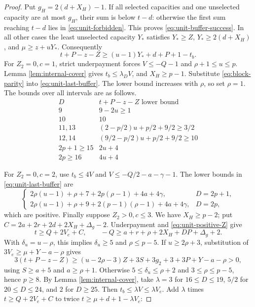 \documentclass[11pt,a4paper]{article}
\theoremstyle{definition}
\begin{document}
\begin{proof}
Put $g_H=2(d+X_H)-1$.
If all selected capacities and one unselected capacity are at most $g_H$, their sum is below $t-d$: otherwise the first sum reaching $t-d$ lies in \eqref{eq:unit-forbidden}.
This proves \eqref{eq:unit-buffer-success}.
In all other cases the least unselected capacity $Y_*$ satisfies
$Y_*\ge Z$, $Y_*\ge2(d+X_H)$, and $\mu\ge z+uY_*$.
Consequently
\begin{equation}\label{eq:unit-last-buffer}
 t+P-z-Z\ge(u-1)Y_*+d+P+1-t_b.
\end{equation}
For $Z_2=0,c=1$, strict underpayment forces $V\le-Q-1$ and $\rho+1\le u\le p$.
Lemma \ref{lem:internal-cover} gives $t_b\le\lambda_DV$, and $X_H\ge p-1$.
Substitute \eqref{eq:block-parity} into \eqref{eq:unit-last-buffer}. The lower bound increases with $\rho$, so set $\rho=1$.
The bounds over all intervals are as follows.
\[
\begin{array}{c|c}
D& t+P-z-Z\text{ lower bound}\\\hline
9&9-2u\ge1\\
10&10\\
11,13&(2-p/2)u+p/2+9/2\ge3/2\\
12,14&(9/2-p/2)u+p/2+9/2\ge10\\
2p+1\ge15&2u+4\\
2p\ge16&4u+4
\end{array}
\]

For $Z_2=0,c=2$, use $t_b\le4V$ and
$V\le-Q/2-a-\gamma-1$.
The lower bounds in \eqref{eq:unit-last-buffer} are
\[
\begin{cases}
2\rho(u-1)+\rho+7+2p(\rho-1)+4a+4\gamma,&D=2p+1,\\
2\rho(u-1)+\rho+9+2(p-1)(\rho-1)+4a+4\gamma,&D=2p,
\end{cases}
\]
which are positive.
Finally suppose $Z_2>0,c\le3$. We have $X_H\ge p-2$; put
$C=2a+2r+2d+2X_H+\Delta_g-2$.
Underpayment and \eqref{eq:unit-positive-Z} give
\[
t\ge Q+2V_e+C,\qquad
-Q\ge a+r+\rho+2X_H+DP+\Delta_g+2.
\]
With $\delta_u=u-\rho$, this implies $\delta_u\ge5$ and $\rho\le p-5$.
If $u\ge2\rho+3$, substitution of $3V_e\ge\mu+Y-a-\rho$ gives
\[
3(t+P-z-Z)\ge(u-2\rho-3)Z+3S+3g_2+3+3P+Y-a-\rho>0,
\]
using $S\ge a+5$ and $a\ge\rho+1$.
Otherwise $5\le\delta_u\le\rho+2$ and $3\le\rho\le p-5$, hence $p\ge8$.
By Lemma \ref{lem:internal-cover}, take
$\lambda=3$ for $16\le D\le19$, $5/2$ for $20\le D\le24$, and $2$ for $D\ge25$.
Then $t_b\le\lambda V\le\lambda V_e$.
Add $\lambda$ times $t\ge Q+2V_e+C$ to twice $t\ge\mu+d+1-\lambda V_e$:


\end{proof}
\end{document}
